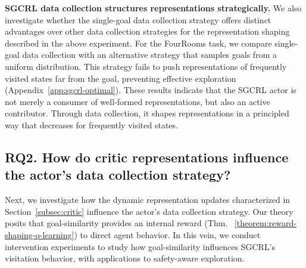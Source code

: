 \documentclass{article}
\begin{document}
\textbf{SGCRL data collection structures representations strategically.} We also investigate whether the single-goal data collection strategy offers distinct advantages over other data collection strategies for the representation shaping described in the above experiment. For the FourRooms task, we compare single-goal data collection with an alternative strategy that samples goals from a uniform distribution. This strategy fails to push representations of frequently visited states far from the goal, preventing effective exploration (Appendix~\ref{app:sgcrl-optimal}). These results indicate that the SGCRL actor is not merely a consumer of well-formed representations, but also an active contributor. Through data collection, it shapes representations in a principled way that decreases \psisim for frequently visited states. 
 \subsection{RQ2. How do critic representations influence the actor's data collection strategy?}\label{subsec:rq2}
 
Next, we investigate how the dynamic representation updates characterized in Section~\ref{subsec:critic} influence the actor's data collection strategy. Our theory posits that goal-similarity provides an internal reward (Thm. ~\ref{theorem:reward-shaping-q-learning}) to direct agent behavior. In this vein, we conduct intervention experiments to study how goal-similarity influences SGCRL's visitation behavior, with applications to safety-aware exploration. 
\end{document}
